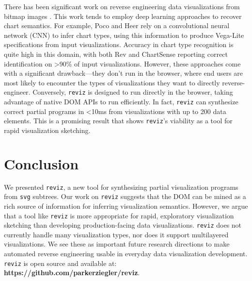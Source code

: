 \documentclass[acmsmall,screen,nonacm]{acmart}
\newcommand{\code}[1]{\texttt{#1}}
\begin{document}
There has been significant work on reverse engineering data visualizations from bitmap images \cite{poco_heer:2017, jung_etal:2017, savva_etal:2011}. This work tends to employ deep learning approaches to recover chart semantics. For example, Poco and Heer rely on a convolutional neural network (CNN) to infer chart types, using this information to produce Vega-Lite specifications from input visualizations. Accuracy in chart type recognition is quite high in this domain, with both Rev \cite{poco_heer:2017} and ChartSense \cite{jung_etal:2017} reporting correct identification on >90\% of input visualizations. However, these approaches come with a significant drawback—they don't run in the browser, where end users are most likely to encounter the types of visualizations they want to directly reverse-engineer. Conversely, \code{reviz} is designed to run directly in the browser, taking advantage of native DOM APIs to run efficiently. In fact, \code{reviz} can synthesize correct partial programs in <10ms from visualizations with up to 200 data elements. This is a promising result that shows \code{reviz}'s viability as a tool for rapid visualization sketching.

\section{Conclusion}

We presented \code{reviz}, a new tool for synthesizing partial visualization programs from \code{svg} subtrees. Our work on \code{reviz} suggests that the DOM can be mined as a rich source of information for inferring visualization semantics. However, we argue that a tool like \code{reviz} is more appropriate for rapid, exploratory visualization sketching than developing production-facing data visualizations. \code{reviz} does not currently handle many visualization types, nor does it support multilayered visualizations. We see these as important future research directions to make automated reverse engineering usable in everyday data visualization development. \code{reviz} is open source and available at: \textbf{https://github.com/parkerziegler/reviz}.



\end{document}
